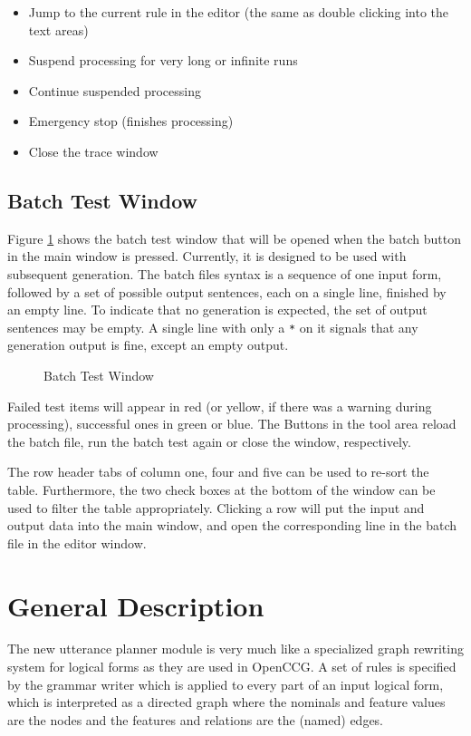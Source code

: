 \documentclass[11pt,a4paper]{article}
\begin{document}
\begin{itemize}\addtolength{\itemsep}{-.7\itemsep}
\item Jump to the current rule in the editor (the same as double clicking into
  the text areas)
\item Suspend processing for very long or infinite runs
\item Continue suspended processing
\item Emergency stop (finishes processing)
\item Close the trace window
\end{itemize}

\subsection{Batch Test Window}

Figure \ref{fig:batchwindow} shows the batch test window that will be opened
when the batch button in the main window is pressed. Currently, it is designed
to be used with subsequent generation. The batch files syntax is a sequence of
one input form, followed by a set of possible output sentences, each on a
single line, finished by an empty line. To indicate that no generation is
expected, the set of output sentences may be empty. A single line with only a
\texttt{*} on it signals that any generation output is fine, except an empty
output.

\begin{figure}[htbp]
  \centering
  \caption{Batch Test Window}
  \label{fig:batchwindow}
\end{figure}

Failed test items will appear in red (or yellow, if there was a warning
during processing), successful ones in green or blue. The Buttons in the
tool area reload the batch file, run the batch test again or close the window,
respectively.

The row header tabs of column one, four and five can be used to re-sort the
table. Furthermore, the two check boxes at the bottom of the window can be used
to filter the table appropriately. Clicking a row will put the input and
output data into the main window, and open the corresponding line in the batch
file in the editor window.

\section{General Description}
The new utterance planner module is very much like a specialized graph
rewriting system for logical forms as they are used in OpenCCG. A set of
rules is specified by the grammar writer which is applied to every part of
an input logical form, which is interpreted as a directed graph where the
nominals and feature values are the nodes and the features and relations are
the (named) edges.
\end{document}
